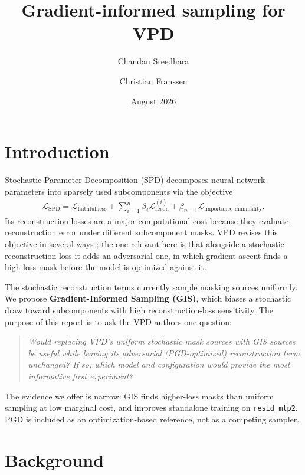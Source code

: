 \documentclass[11pt]{article}
\title{Gradient-informed sampling for VPD}
\author{Chandan Sreedhara \and Christian Franssen}
\date{August 2026}
\begin{document}
\maketitle

\section{Introduction}

Stochastic Parameter Decomposition (SPD) \cite{bushnaq2025stochasticparameterdecomposition}
decomposes neural network parameters into sparsely used subcomponents via the objective
\begin{align*}
    \mathcal{L}_{\mathrm{SPD}}
    = \mathcal{L}_{\mathrm{faithfulness}}
    + \sum_{i=1}^n \beta_i \mathcal{L}^{(i)}_{\mathrm{recon}}
    + \beta_{n+1} \mathcal{L}_{\mathrm{importance\text{-}minimality}}.
\end{align*}
Its reconstruction losses are a major computational cost because they evaluate
reconstruction error under different subcomponent masks. VPD revises this objective in
several ways \cite{bushnaq2026interpreting}; the one relevant here is that alongside a
stochastic reconstruction loss it adds an adversarial one, in which gradient ascent finds
a high-loss mask before the model is optimized against it.

The stochastic reconstruction terms currently sample masking sources uniformly. We
propose \textbf{Gradient-Informed Sampling (GIS)}, which biases a stochastic draw toward
subcomponents with high reconstruction-loss sensitivity. The purpose of this report is
to ask the VPD authors one question:

\begin{quote}
\emph{Would replacing VPD's uniform stochastic mask sources with GIS sources be useful
while leaving its adversarial (PGD-optimized) reconstruction term unchanged? If so,
which model and configuration would provide the most informative first experiment?}
\end{quote}

The evidence we offer is narrow: GIS finds higher-loss masks than uniform sampling at
low marginal cost, and improves standalone training on \texttt{resid\_mlp2}. PGD is
included as an optimization-based reference, not as a competing sampler.

\section{Background}
\end{document}
